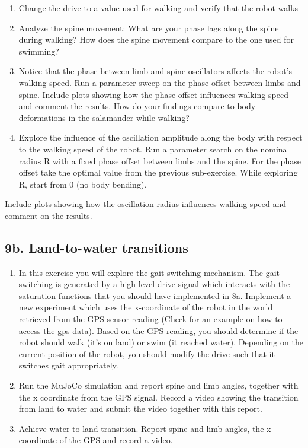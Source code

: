 \documentclass{cmc}
\begin{document}
\begin{enumerate}
\item Change the drive to a value used for walking and verify that the robot
  walks
\item Analyze the spine movement: What are your phase lags along the spine
  during walking? How does the spine movement compare to the one used for
  swimming?
\item Notice that the phase between limb and spine oscillators affects the
  robot’s walking speed. Run a parameter sweep on the phase offset between
  limbs and spine. Include plots showing how the phase offset influences walking
  speed and comment the results. How do your findings compare to body
  deformations in the salamander while walking?
\item Explore the influence of the oscillation amplitude along the body with
  respect to the walking speed of the robot. Run a parameter search on the
  nominal radius R with a fixed phase offset between limbs and the spine. For
  the phase offset take the optimal value from the previous sub-exercise. While
  exploring R, start from 0 (no body bending).
\end{enumerate}

Include plots showing how the oscillation radius influences walking speed and
comment on the results.



\subsection*{9b. Land-to-water transitions}

\begin{enumerate}
\item In this exercise you will explore the gait switching mechanism. The gait
  switching is generated by a high level drive signal which interacts with the
  saturation functions that you should have implemented in 8a. Implement a new
  experiment which uses the x-coordinate of the robot in the world retrieved
  from the GPS sensor reading (Check  for an example on how
  to access the gps data). Based on the GPS reading,
  you should determine if the robot should walk (it’s on land) or swim (it
  reached water). Depending on the current position of the robot, you should
  modify the drive such that it switches gait appropriately.
\item Run the MuJoCo simulation and report spine and limb angles, together with
  the x coordinate from the GPS signal. Record a video showing the transition
  from land to water and submit the video together with this report.
\item Achieve water-to-land transition. Report spine and limb angles,
  the x-coordinate of the GPS and record a video.
\end{enumerate}
\end{document}
